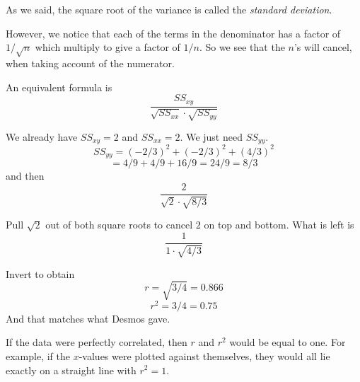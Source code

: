 \documentclass[11pt, oneside]{article}
\begin{document}
As we said, the square root of the variance is called the \emph{standard deviation}.

However, we notice that each of the terms in the denominator has a factor of $1/\sqrt{n}$ which multiply to give a factor of $1/n$.  So we see that the $n$'s will cancel, when taking account of the numerator.

An equivalent formula is
\[ \frac{SS_{xy}}{\sqrt{SS_{xx}} \cdot \sqrt{SS_{yy}}} \]

We already have $SS_{xy} = 2$ and $SS_{xx} = 2$.  We just need $SS_{yy}$.
\[ SS_{yy} = (-2/3)^2 + (-2/3)^2 + (4/3)^2 \]
\[ = 4/9 + 4/9 + 16/9 = 24/9 = 8/3 \]
and then
\[ \frac{2}{\sqrt{2} \cdot \sqrt{8/3}} \]

Pull $\sqrt{2}$ out of both square roots to cancel $2$ on top and bottom.  What is left is
\[ \frac{1}{1 \cdot \sqrt{4/3}} \]

Invert to obtain 
\[ r = \sqrt{3/4} = 0.866 \]
\[ r^2 = 3/4 = 0.75 \]
And that matches what Desmos gave.

If the data were perfectly correlated, then $r$ and $r^2$ would be equal to one.  For example, if the $x$-values were plotted against themselves, they would all lie exactly on a straight line with $r^2 = 1$.
\end{document}
